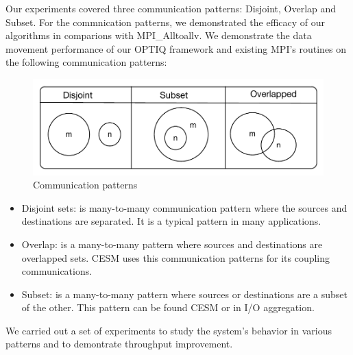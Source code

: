 Our experiments covered three communication patterns: Disjoint, Overlap and Subset. For the commnication patterns, we demonstrated the efficacy of our algorithms in comparions with MPI\_Alltoallv.
We demonstrate the data movement performance of our OPTIQ framework and existing MPI's routines on the following communication patterns:
\begin{figure}[ht]
\vspace{-0.1in}
\centering
\includegraphics[scale=0.55]{figures/patterns.pdf}
\vspace{-0.1in}
\caption{Communication patterns}
\vspace{-0.1in}
\label{fig:patterns}
\end{figure}
\begin{itemize}
\item Disjoint sets: is many-to-many communication pattern where the sources and destinations are separated. It is a typical pattern in many applications.
\item Overlap: is a many-to-many pattern where sources and destinations are overlapped sets. CESM uses this communication patterns for its coupling communications.
\item Subset: is a many-to-many pattern where sources or destinations are a subset of the other. This pattern can be found CESM or in I/O aggregation.
\end{itemize}
We carried out a set of experiments to study the system's behavior in various patterns and to demontrate throughput improvement.

